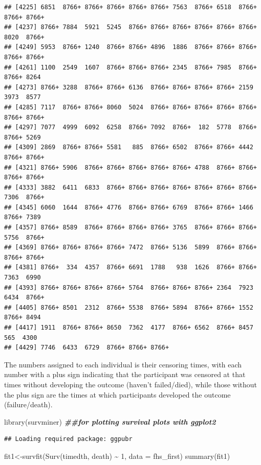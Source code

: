 \documentclass[
]{book}
\newenvironment{Shaded}{\begin{snugshade}}{\end{snugshade}}
\newcommand{\AttributeTok}[1]{\textcolor[rgb]{0.77,0.63,0.00}{#1}}
\newcommand{\DecValTok}[1]{\textcolor[rgb]{0.00,0.00,0.81}{#1}}
\newcommand{\DocumentationTok}[1]{\textcolor[rgb]{0.56,0.35,0.01}{\textbf{\textit{#1}}}}
\newcommand{\FunctionTok}[1]{\textcolor[rgb]{0.00,0.00,0.00}{#1}}
\newcommand{\NormalTok}[1]{#1}
\newcommand{\OtherTok}[1]{\textcolor[rgb]{0.56,0.35,0.01}{#1}}
\newcommand{\SpecialCharTok}[1]{\textcolor[rgb]{0.00,0.00,0.00}{#1}}
\begin{document}
\begin{verbatim}
## [4225] 6851  8766+ 8766+ 8766+ 8766+ 8766+ 7563  8766+ 6518  8766+ 8766+ 8766+
## [4237] 8766+ 7884  5921  5245  8766+ 8766+ 8766+ 8766+ 8766+ 8766+ 8020  8766+
## [4249] 5953  8766+ 1240  8766+ 8766+ 4896  1886  8766+ 8766+ 8766+ 8766+ 8766+
## [4261] 1100  2549  1607  8766+ 8766+ 8766+ 2345  8766+ 7985  8766+ 8766+ 8264 
## [4273] 8766+ 3288  8766+ 8766+ 6136  8766+ 8766+ 8766+ 8766+ 2159  3973  8577 
## [4285] 7117  8766+ 8766+ 8060  5024  8766+ 8766+ 8766+ 8766+ 8766+ 8766+ 8766+
## [4297] 7077  4999  6092  6258  8766+ 7092  8766+  182  5778  8766+ 8766+ 5269 
## [4309] 2869  8766+ 8766+ 5581   885  8766+ 6502  8766+ 8766+ 4442  8766+ 8766+
## [4321] 8766+ 5906  8766+ 8766+ 8766+ 8766+ 8766+ 4788  8766+ 8766+ 8766+ 8766+
## [4333] 3882  6411  6833  8766+ 8766+ 8766+ 8766+ 8766+ 8766+ 8766+ 7306  8766+
## [4345] 6060  1644  8766+ 4776  8766+ 8766+ 6769  8766+ 8766+ 1466  8766+ 7389 
## [4357] 8766+ 8589  8766+ 8766+ 8766+ 8766+ 3765  8766+ 8766+ 8766+ 5756  8766+
## [4369] 8766+ 8766+ 8766+ 8766+ 7472  8766+ 5136  5899  8766+ 8766+ 8766+ 8766+
## [4381] 8766+  334  4357  8766+ 6691  1788   938  1626  8766+ 8766+ 7363  6990 
## [4393] 8766+ 8766+ 8766+ 8766+ 5764  8766+ 8766+ 8766+ 2364  7923  6434  8766+
## [4405] 8766+ 8501  2312  8766+ 5538  8766+ 5894  8766+ 8766+ 1552  8766+ 8494 
## [4417] 1911  8766+ 8766+ 8650  7362  4177  8766+ 6562  8766+ 8457   565  4300 
## [4429] 7746  6433  6729  8766+ 8766+ 8766+
\end{verbatim}

The numbers assigned to each individual is their censoring times, with each number with a plus sign indicating that the participant was censored at that times without developing the outcome (haven't failed/died), while those without the plus sign are the times at which participants developed the outcome (failure/death).

\begin{Shaded}
\begin{Highlighting}[]
\FunctionTok{library}\NormalTok{(survminer) }\DocumentationTok{\#\#for plotting survival plots with ggplot2}
\end{Highlighting}
\end{Shaded}

\begin{verbatim}
## Loading required package: ggpubr
\end{verbatim}

\begin{Shaded}
\begin{Highlighting}[]
\NormalTok{fit1}\OtherTok{\textless{}{-}}\FunctionTok{survfit}\NormalTok{(}\FunctionTok{Surv}\NormalTok{(timedth, death) }\SpecialCharTok{\textasciitilde{}} \DecValTok{1}\NormalTok{, }\AttributeTok{data =}\NormalTok{ fhs\_first)}
\FunctionTok{summary}\NormalTok{(fit1)}
\end{Highlighting}
\end{Shaded}
\end{document}
